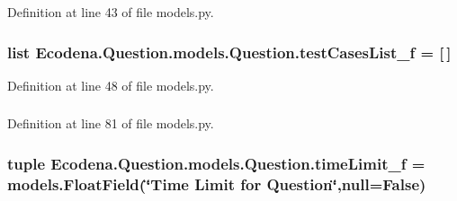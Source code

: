 Definition at line 43 of file models.py.

\hypertarget{class_ecodena_1_1_question_1_1models_1_1_question_aab630f0c2e6a45bd234c67481afc1448}{
\subsubsection[{testCasesList\_\-f}]{\setlength{\rightskip}{0pt plus 5cm}list {\bf Ecodena.Question.models.Question.testCasesList\_\-f} = \mbox{[}$\,$\mbox{]}}}
\label{d1/d67/class_ecodena_1_1_question_1_1models_1_1_question_aab630f0c2e6a45bd234c67481afc1448}


Definition at line 48 of file models.py.

\hypertarget{class_ecodena_1_1_question_1_1models_1_1_question_af2ca53119fdb8e495aa8d427287dcdb2}{
\subsubsection[{testCasesList\_\-f}]{}}
\label{d1/d67/class_ecodena_1_1_question_1_1models_1_1_question_af2ca53119fdb8e495aa8d427287dcdb2}


Definition at line 81 of file models.py.

\hypertarget{class_ecodena_1_1_question_1_1models_1_1_question_a4143fa9996843ba6c2febcab8e8ceae8}{
\subsubsection[{timeLimit\_\-f}]{\setlength{\rightskip}{0pt plus 5cm}tuple {\bf Ecodena.Question.models.Question.timeLimit\_\-f} = models.FloatField(\char`\"{}Time Limit for {\bf Question}\char`\"{},null=False)}}
\label{d1/d67/class_ecodena_1_1_question_1_1models_1_1_question_a4143fa9996843ba6c2febcab8e8ceae8}


